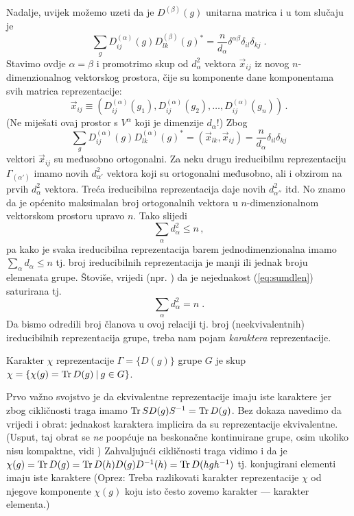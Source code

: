 Nadalje, uvijek možemo uzeti da je $D^{(\beta)}(g)$ unitarna matrica
i u tom slučaju je
\begin{displaymath}
\sum_g D^{(\alpha)}_{ij}(g) D^{(\beta)}_{lk}(g)^* =
 \frac{n}{d_{\alpha}}\delta^{\alpha\beta}\delta_{il}\delta_{kj} \;.
\end{displaymath}
Stavimo ovdje $\alpha=\beta$ i promotrimo skup od $d^{2}_\alpha$ vektora
$\vec{x}_{ij}$ iz novog $n$-dimenzionalnog vektorskog prostora,  čije
su komponente dane komponentama svih matrica reprezentacije:
\begin{displaymath}
\vec{x}_{ij} \equiv
(D^{(\alpha)}_{ij}(g_1), D^{(\alpha)}_{ij}(g_2), \ldots, 
D^{(\alpha)}_{ij}(g_n)) \,.
\end{displaymath}
(Ne miješati ovaj
prostor s $V^{\alpha}$ koji je dimenzije $d_\alpha$!) Zbog
\begin{displaymath}
\sum_g D^{(\alpha)}_{ij}(g) D^{(\alpha)}_{lk}(g)^* = (\vec{x}_{lk},\vec{x}_{ij})
 =\frac{n}{d_{\alpha}}\delta_{il}\delta_{kj}
\end{displaymath}
vektori $\vec{x}_{ij}$ su međusobno ortogonalni.
Za neku drugu ireducibilnu reprezentaciju 
$\Gamma_{(\alpha')}$ imamo novih $d_{\alpha'}^{2}$
vektora  koji su ortogonalni međusobno, ali i obzirom na prvih
$d_{\alpha}^{2}$ vektora. Treća ireducibilna reprezentacija daje novih $d_{\alpha''}^{2}$ itd.
No znamo da je općenito maksimalan broj ortogonalnih 
vektora u $n$-dimenzionalnom vektorskom prostoru upravo $n$.
Tako slijedi
\begin{equation}
\sum_{\alpha} d_{\alpha}^{2} \leq n   \,,
\label{eq:sumdlen}
\end{equation}
pa kako je svaka ireducibilna reprezentacija barem jednodimenzionalna
imamo $\sum_{\alpha} d_\alpha \leq n$ tj.
broj ireducibilnih reprezentacija je manji ili jednak broju elemenata grupe.
Štoviše, vrijedi (npr. \cite{Hamermesh:1989}) da je nejednakost
(\ref{eq:sumdlen}) saturirana tj.
\begin{displaymath}
\sum_{\alpha} d_{\alpha}^2 = n \;.
\end{displaymath}
Da bismo odredili broj članova u ovoj relaciji tj.
broj (neekvivalentnih) ireducibilnih reprezentacija grupe, treba nam
pojam \emph{karaktera} reprezentacije.
\begin{definicija}
Karakter $\chi$ reprezentacije $\Gamma=\{D(g)\}$ grupe $G$ je skup
$\chi=\{\chi(g) = \operatorname{Tr} D(g) \: | \:  g\in G\}$.
\end{definicija}
Prvo važno svojstvo je da ekvivalentne reprezentacije imaju iste
karaktere jer zbog cikličnosti traga
imamo $\operatorname{Tr} S D(g) S^{-1} = \operatorname{Tr} D(g)$.
Bez dokaza navedimo da vrijedi i obrat: jednakost karaktera implicira
da su reprezentacije ekvivalentne.
(Usput, taj obrat se \emph{ne} poopćuje na beskonačne kontinuirane grupe, osim
  ukoliko nisu kompaktne, vidi \cite[302]{Cornwell:1997})
Zahvaljujući cikličnosti traga vidimo i da je
$\chi(g)=\operatorname{Tr} D(g) = \operatorname{Tr} D(h) D(g) D^{-1}(h) = \operatorname{Tr} D(hgh^{-1})$
  tj. konjugirani elementi imaju iste karaktere (Oprez: Treba
  razlikovati karakter reprezentacije $\chi$ od njegove komponente
  $\chi(g)$ koju isto često zovemo karakter --- karakter elementa.)

